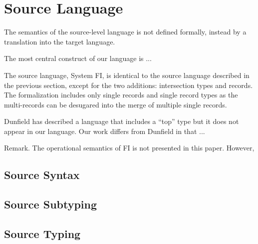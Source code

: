 \section{Source Language}

The semantics of the source-level language is not defined formally, instead by a
translation into the target language.

The most central construct of our language is ...


The source language, System FI, is identical to the source language described in
the previous section, except for the two additions: intersection types and
records. The formalization includes only single records and single record types as the multi-records can be desugared into the merge of multiple single records.

Dunfield has described a language that includes a ``top'' type but it does not appear in our language. Our work differs from Dunfield in that ...

Remark. The operational semantics of FI is not presented in this paper. However,

\subsection{Source Syntax}

\subsection{Source Subtyping}

\subsection{Source Typing}
